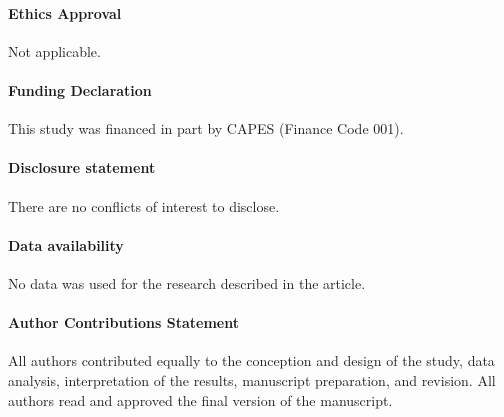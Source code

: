 \documentclass[12pt]{article}
\begin{document}
\paragraph*{Ethics Approval}
Not applicable.

\paragraph*{Funding Declaration}
This study was financed in part by CAPES (Finance Code 001). 

\paragraph*{Disclosure statement}
There are no conflicts of interest to disclose.

\paragraph{Data availability}
No data was used for the research described in the article.

\paragraph*{Author Contributions Statement}
All authors contributed equally to the conception and design of the study, data analysis, interpretation of the results, manuscript preparation, and revision. All authors read and approved the final version of the manuscript.

\end{document}
